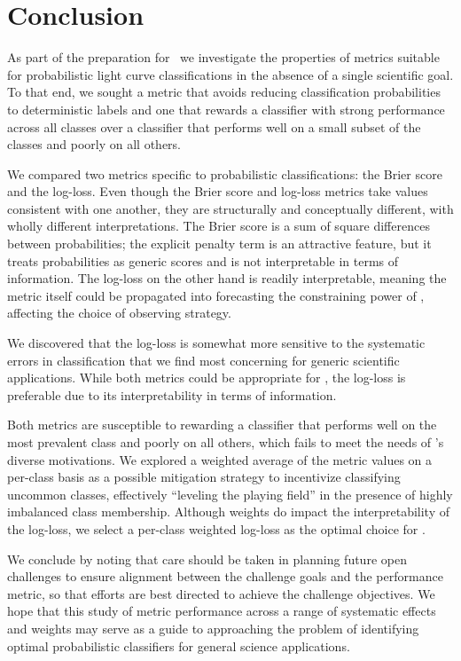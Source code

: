 \section{Conclusion}
\label{sec:conclusion}

As part of the preparation for \plasticc\, we investigate the properties of metrics suitable for probabilistic light curve classifications in the absence of a single scientific goal.
To that end, we sought a metric that avoids reducing classification probabilities to deterministic labels and one that rewards a classifier with strong performance across all classes over a classifier that performs well on a small subset of the classes and poorly on all others.

We compared two metrics specific to probabilistic classifications: the Brier score and the log-loss.
Even though the Brier score and log-loss metrics take values consistent with one another, they are structurally and conceptually different, with wholly different interpretations.
The Brier score is a sum of square differences between probabilities; the explicit penalty term is an attractive feature, but it treats probabilities as generic scores and is not interpretable in terms of information.
The log-loss on the other hand is readily interpretable, meaning the metric itself could be propagated into forecasting the constraining power of \lsst, affecting the choice of observing strategy.

We discovered that the log-loss is somewhat more sensitive to the systematic errors in classification that we find most concerning for generic scientific applications.
While both metrics could be appropriate for \plasticc, the log-loss is preferable due to its interpretability in terms of information.

Both metrics are susceptible to rewarding a classifier that performs well on the most prevalent class and poorly on all others, which fails to meet the needs of \plasticc's diverse motivations.
We explored a weighted average of the metric values on a per-class basis as a possible mitigation strategy to incentivize classifying uncommon classes, effectively ``leveling the playing field'' in the presence of highly imbalanced class membership.
Although weights do impact the interpretability of the log-loss, we select a per-class weighted log-loss as the optimal choice for \plasticc.


We conclude by noting that care should be taken in planning future open challenges to ensure alignment between the challenge goals and the performance metric, so that efforts are best directed to achieve the challenge objectives.
We hope that this study of metric performance across a range of systematic effects and weights may serve as a guide to approaching the problem of identifying optimal probabilistic classifiers for general science applications.
